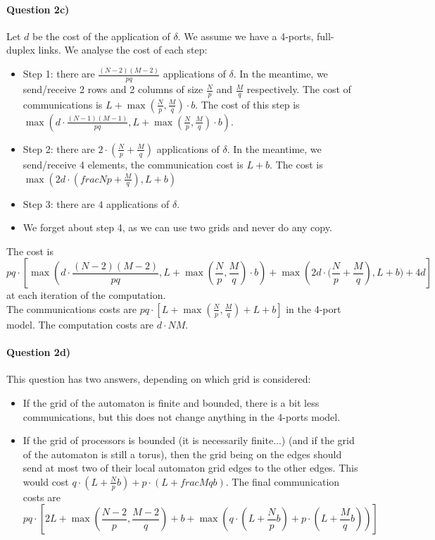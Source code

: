 \documentclass[a4paper,12pt]{article}
\begin{document}
\paragraph{Question 2c)}
Let $d$ be the cost of the application of $\delta$. We assume we have a 4-ports, full-duplex links. We analyse the cost of each step:
\begin{itemize}
\item Step 1: there are $\frac{(N-2)(M-2)}{pq}$ applications of $\delta$. In the meantime, we send/receive 2 rows and 2 columns of size $\frac{N}{p}$ and $\frac{M}{q}$ respectively. The cost of communications is $L + \max(\frac{N}{p}, \frac{M}{q}) \cdot b$. The cost of this step is $\max(d \cdot \frac{(N-1)(M-1)}{pq}, L + \max(\frac{N}{p}, \frac{M}{q}) \cdot b)$.
\item Step 2: there are $2 \cdot (\frac{N}{p} + \frac{M}{q})$ applications of $\delta$. In the meantime, we send/receive 4 elements, the communication cost is $L + b$. The cost is $\max(2d \cdot (frac{N}{p} + \frac{M}{q}), L + b)$
\item Step 3: there are $4$ applications of $\delta$.
\item We forget about step 4, as we can use two grids and never do any copy.
\end{itemize}
The cost is $$pq \cdot \left [ \max \left ( d \cdot \frac{(N-2)(M-2)}{pq}, L + \max(\frac{N}{p}, \frac{M}{q}) \cdot b \right )  + \max \left ( 2d \cdot (\frac{N}{p} + \frac{M}{q} \right ), L + b) + 4d \right ]$$ at each iteration of the computation.\\
The communications costs are $pq \cdot \left [ L + \max(\frac{N}{p}, \frac{M}{q}) + L + b \right ]$ in the 4-port model. The computation costs are $d \cdot NM$.

\paragraph{Question 2d)} This question has two answers, depending on which grid is considered:
\begin{itemize}
\item If the grid of the automaton is finite and bounded, there is a bit less communications, but this does not change anything in the 4-ports model.
\item If the grid of processors is bounded (it is necessarily finite...) (and if the grid of the automaton is still a torus), then the grid being on the edges should send at most two of their local automaton grid edges to the other edges. This would cost $q\cdot(L + \frac{N}{p}b) + p\cdot(L+frac{M}{q}b)$. The final communication costs are $$pq \cdot \left [ 2L + \max(\frac{N-2}{p}, \frac{M-2}{q}) + b + \max \left ( q\cdot(L + \frac{N}{p}b) + p\cdot(L+\frac{M}{q}b) \right ) \right ]$$
\end{itemize}
\end{document}
